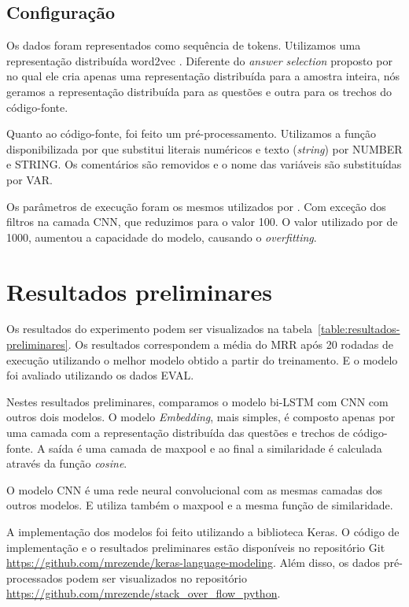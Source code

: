 \documentclass[12pt]{article}
\begin{document}
\subsection{Configuração}

Os dados foram representados como sequência de tokens. Utilizamos uma representação distribuída word2vec \cite{mikolov-word2vec-2013}. Diferente do \textit{answer selection} proposto por \cite{tan-lstm-qa} no qual ele cria apenas uma representação distribuída para a amostra inteira, nós geramos a representação distribuída para as questões e outra para os trechos do código-fonte.

Quanto ao código-fonte, foi feito um pré-processamento. Utilizamos a função disponibilizada por \cite{Yao-staqc:2018} que substitui literais numéricos e texto (\textit{string}) por NUMBER e STRING. Os comentários são removidos e o nome das variáveis são substituídas por VAR.

Os parâmetros de execução foram os mesmos utilizados por \cite{tan-lstm-qa}. Com exceção dos filtros na camada CNN, que reduzimos para o valor 100. O valor utilizado por \cite{tan-lstm-qa} de 1000, aumentou a capacidade do modelo, causando o \textit{overfitting}.




\section{Resultados preliminares}\label{sec:resultados-preliminares}

Os resultados do experimento podem ser visualizados na tabela~\ref{table:resultados-preliminares}. Os resultados correspondem a média do MRR após 20 rodadas de execução utilizando o melhor modelo obtido a partir do treinamento. E o modelo foi avaliado utilizando os dados EVAL. 

Nestes resultados preliminares, comparamos o modelo bi-LSTM com CNN com outros dois modelos. O modelo \emph{Embedding}, mais simples, é composto apenas por uma camada com a representação distribuída das questões e trechos de código-fonte. A saída é uma camada de maxpool e ao final a similaridade é calculada através da função \textit{cosine}. 

O modelo CNN é uma rede neural convolucional com as mesmas camadas dos outros modelos. E utiliza também o maxpool e a mesma função de similaridade.

A implementação dos modelos foi feito utilizando a biblioteca Keras. O código de implementação e o resultados preliminares estão disponíveis no repositório Git \url{https://github.com/mrezende/keras-language-modeling}. Além disso, os dados pré-processados podem ser visualizados no repositório \url{https://github.com/mrezende/stack_over_flow_python}.
\end{document}
